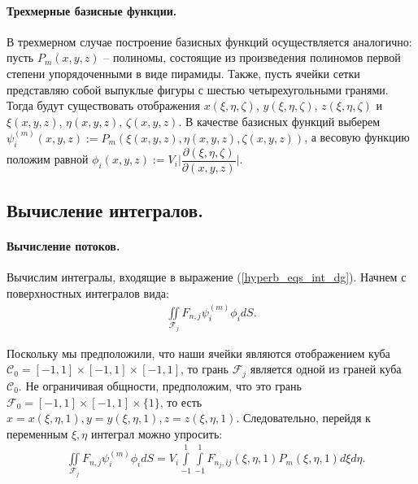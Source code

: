 \documentclass[14pt, a4paper, fleqn]{extreport}
\begin{document}
	\paragraph{Трехмерные базисные функции.}
	В трехмерном случае построение базисных функций осуществляется аналогично:
	пусть $P_m(x,y,z)$ -- полиномы, состоящие из произведения полиномов
	первой степени упорядоченными в виде пирамиды.
	Также, пусть ячейки сетки представляю собой выпуклые фигуры с шестью
	четырехугольными гранями.
	Тогда будут существовать отображения 
	$x(\xi,\eta,\zeta)$, $y(\xi,\eta,\zeta)$, $z(\xi,\eta,\zeta)$ и
	$\xi(x,y,z)$, $\eta(x,y,z)$, $\zeta(x,y,z)$.
	В качестве базисных функций выберем 
	$\psi_i^{(m)}(x,y,z) := P_m(\xi(x,y,z),\eta(x,y,z),\zeta(x,y,z))$, 
	а весовую функцию положим равной 
	$\phi_i(x,y,z) := V_i\Big|\dfrac{\partial(\xi,\eta,\zeta)}{\partial(x,y,z)}\Big|$.
	
	\subsection{Вычисление интегралов.}
	
	\paragraph{Вычисление потоков.}
	Вычислим интегралы, входящие в выражение (\ref{hyperb_eqs_int_dg}).
	Начнем с поверхностных интегралов вида:
	\begin{equation*}
	\begin{split}
		\iint\limits_{\mathcal{F}_j} F_{n,j} \psi_i^{(m)} \phi_i dS.
	\end{split}
	\end{equation*}
	
	Поскольку мы предположили, что наши ячейки являются отображением 
	куба $\mathcal{C}_0 = [-1,1] \times [-1,1] \times [-1,1]$,
	то грань $\mathcal{F}_j$ является одной из граней куба $\mathcal{C}_0$.
	Не ограничивая общности, предположим, что это 
	грань $\mathcal{F}_0 = [-1,1] \times [-1,1] \times \lbrace 1 \rbrace$,
	то есть $x=x(\xi,\eta,1),y=y(\xi,\eta,1),z=z(\xi,\eta,1)$.
	Следовательно, перейдя к переменным $\xi,\eta$ интеграл можно упросить:
	\begin{equation*}
	\begin{split}
		&\iint\limits_{\mathcal{F}_j} F_{n,j} \psi_i^{(m)} \phi_i dS 
			= V_i \int\limits_{-1}^{1} \int\limits_{-1}^{1} 
				F_{n_j,ij}(\xi,\eta,1)P_m(\xi,\eta,1)d\xi d\eta.
	\end{split}
	\end{equation*}
	
\end{document}
